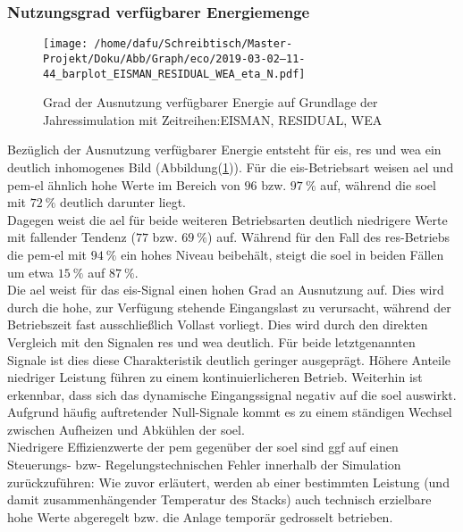 \documentclass[onecolumn,10pt,titlepage]{article}
\begin{document}
\subsubsection{Nutzungsgrad verfügbarer Energiemenge}
\begin{figure}[H]
	\centering
	\texttt{[image: /home/dafu/Schreibtisch/Master-Projekt/Doku/Abb/Graph/eco/2019-03-02--11-44\_barplot\_EISMAN\_RESIDUAL\_WEA\_eta\_N.pdf]}
	\caption[Energie-Ausnutzung EIS, RES, WEA]{Grad der Ausnutzung verfügbarer Energie auf Grundlage der Jahressimulation mit Zeitreihen:EISMAN, RESIDUAL, WEA }
	\label{fig:analy_nC_etaN} 
\end{figure}
Bezüglich der Ausnutzung verfügbarer Energie entsteht für \gls{eis}, \gls{res} und \gls{wea} ein deutlich inhomogenes Bild (Abbildung(\ref{fig:analy_nC_etaN})).
Für die \gls{eis}-Betriebsart weisen \gls{ael} und \gls{pem}-\gls{el} ähnlich hohe Werte im Bereich von $96$ bzw. $97~\%$ auf, während die \gls{soel} mit $72~\%$ deutlich darunter liegt.\\
Dagegen weist die \gls{ael} für beide weiteren Betriebsarten deutlich niedrigere Werte mit fallender Tendenz ($77$ bzw. $69~\%$) auf. Während für den Fall des \gls{res}-Betriebs die \gls{pem}-\gls{el} mit $94~\%$ ein hohes Niveau beibehält, steigt die \gls{soel} in beiden Fällen um etwa $15~\%$ auf $87~\%$.\\
 
Die \gls{ael} weist für das \gls{eis}-Signal einen hohen Grad an Ausnutzung auf. Dies wird durch die hohe, zur Verfügung stehende Eingangslast zu verursacht, während der Betriebszeit fast ausschließlich Vollast vorliegt. Dies wird durch den direkten Vergleich mit den Signalen \gls{res} und \gls{wea} deutlich. Für beide letztgenannten Signale ist dies diese Charakteristik deutlich geringer ausgeprägt. Höhere Anteile niedriger Leistung führen zu einem kontinuierlicheren Betrieb. Weiterhin ist erkennbar, dass sich das dynamische Eingangssignal negativ auf die \gls{soel} auswirkt. Aufgrund häufig auftretender Null-Signale kommt es zu einem ständigen Wechsel zwischen Aufheizen und Abkühlen der \gls{soel}.\\
Niedrigere Effizienzwerte der \gls{pem} gegenüber der \gls{soel} sind ggf auf einen Steuerungs- bzw- Regelungstechnischen Fehler innerhalb der Simulation zurückzuführen: %
Wie zuvor erläutert, werden ab einer bestimmten Leistung (und damit zusammenhängender Temperatur des Stacks)  auch technisch erzielbare hohe Werte abgeregelt bzw. die Anlage temporär gedrosselt betrieben.  
\end{document}
